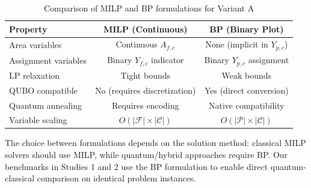 \documentclass{oqireport}
\begin{document}
\begin{table}[H]
\centering
\caption{Comparison of MILP and BP formulations for Variant A}
\label{tab:formulation_comparison}
\begin{tabular}{@{}lcc@{}}
\toprule
\textbf{Property} & \textbf{MILP (Continuous)} & \textbf{BP (Binary Plot)} \\
\midrule
Area variables & Continuous $A_{f,c}$ & None (implicit in $Y_{p,c}$) \\
Assignment variables & Binary $Y_{f,c}$ indicator & Binary $Y_{p,c}$ assignment \\
LP relaxation & Tight bounds & Weak bounds \\
QUBO compatible & No (requires discretization) & Yes (direct conversion) \\
Quantum annealing & Requires encoding & Native compatibility \\
Variable scaling & $O(|\mathcal{F}| \times |\mathcal{C}|)$ & $O(|\mathcal{P}| \times |\mathcal{C}|)$ \\
\bottomrule
\end{tabular}
\end{table}

The choice between formulations depends on the solution method: classical MILP solvers should use MILP, while quantum/hybrid approaches require BP. Our benchmarks in Studies 1 and 2 use the BP formulation to enable direct quantum-classical comparison on identical problem instances.







\end{document}
